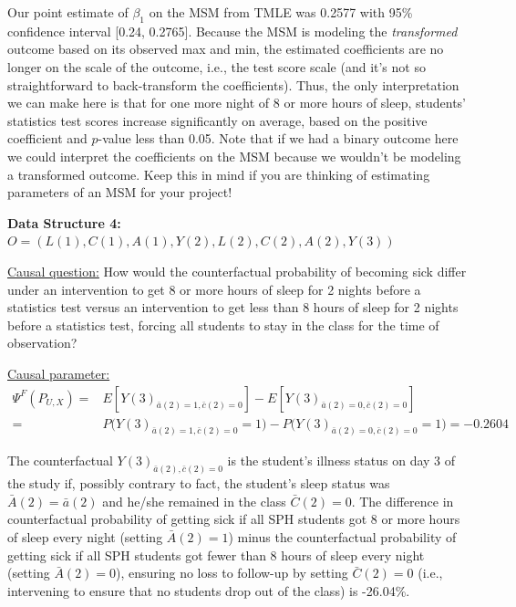 \documentclass[answers]{exam}
\begin{document}
\begin{solution}
Our point estimate of $\beta_1$ on the MSM from TMLE was 0.2577 with 95\% confidence interval [0.24, 0.2765]. Because the MSM is modeling the \textit{transformed} outcome based on its observed max and min, the estimated coefficients are no longer on the scale of the outcome, i.e., the test score scale (and it's not so straightforward to back-transform the coefficients). Thus, the only interpretation we can make here is that for one more night of 8 or more hours of sleep, students' statistics test scores increase significantly on average, based on the positive coefficient and $p$-value less than 0.05. Note that if we had a binary outcome here we could interpret the coefficients on the MSM because we wouldn't be modeling a transformed outcome. Keep this in mind if you are thinking of estimating parameters of an MSM for your project!

\end{solution}


\noindent\large\textbf{Data Structure 4: $O = (L(1), C(1), A(1), Y(2), L(2), C(2), A(2), Y(3))$}
\normalsize


\noindent\underline{Causal question:} How would the counterfactual probability of becoming sick differ under an intervention to get 8 or more hours of sleep for 2 nights before a statistics test versus an intervention to get less than 8 hours of sleep for 2 nights before a statistics test, forcing all students to stay in the class for the time of observation? 

\noindent\underline{Causal parameter:}
\begin{align*}
\Psi^F(P_{U,X}) = & E[Y(3)_{\bar{a}(2) = 1, \bar{c}(2) = 0}] - E[Y(3)_{\bar{a}(2) = 0, \bar{c}(2) = 0}] \\
= & P\big(Y(3)_{\bar{a}(2) = 1, \bar{c}(2) = 0} = 1\big) - P\big(Y(3)_{\bar{a}(2) = 0, \bar{c}(2) = 0} = 1\big) = -0.2604
\end{align*}

The counterfactual $Y(3)_{\bar{a}(2), \bar{c}(2)=0}$ is the student's illness status on day 3 of the study if, possibly contrary to fact, the student's sleep status was $\bar{A}(2)=\bar{a}(2)$ and he/she remained in the class $\bar{C}(2) = 0$. The difference in counterfactual probability of getting sick if all SPH students got 8 or more hours of sleep every night (setting $\bar{A}(2) = 1$) minus the counterfactual probability of getting sick if all SPH students got fewer than 8 hours of sleep every night (setting $\bar{A}(2) = 0$), ensuring no loss to follow-up by setting $\bar{C}(2) = 0$ (i.e., intervening to ensure that no students drop out of the class) is -26.04\%. 
\end{document}

